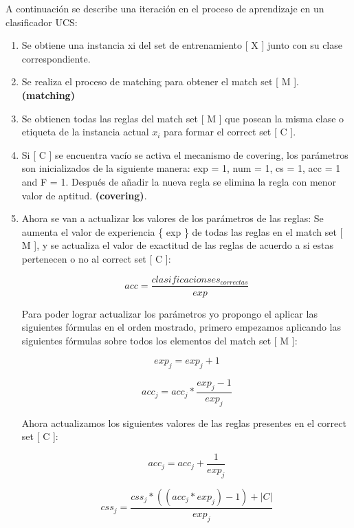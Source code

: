 \documentclass[11pt,fleqn]{book} %
\begin{document}
A continuación se describe una iteración en el proceso de aprendizaje en un clasificador UCS:
\begin{enumerate}
\item Se obtiene una instancia xi del set de entrenamiento [ X ] junto con su clase correspondiente.
\item Se realiza el proceso de matching para obtener el match set [ M ]. \textbf{(matching)} 
\item Se obtienen todas las reglas del match set [ M ] que posean la misma clase o etiqueta de la instancia actual $x_i$ para formar el correct set [ C ].
\item Si [ C ] se encuentra vacío se activa el mecanismo de covering, los parámetros son inicializados de la siguiente manera: exp = 1, num = 1, cs = 1, acc = 1 and F = 1. Después de añadir la nueva regla se elimina la regla con menor valor de aptitud. \textbf{(covering)}.
\item Ahora se van a actualizar los valores de los parámetros de las reglas:
Se aumenta el valor de experiencia \{ exp \} de todas las reglas en el match set [ M ], y se actualiza el valor de exactitud de las reglas de acuerdo a si estas pertenecen o no al correct set [ C ]:

\begin{equation}
acc=\frac{clasificacionses_{correctas}}{exp}
\end{equation}

Para poder lograr actualizar los parámetros yo propongo el aplicar las siguientes fórmulas en el orden mostrado, primero empezamos aplicando las siguientes fórmulas sobre todos los elementos del match set [ M ]:

\begin{equation}
exp_j=exp_j+1
\end{equation}

\begin{equation}
acc_j=acc_j*\frac{exp_j-1}{exp_j}
\end{equation}

Ahora actualizamos los siguientes valores de las reglas presentes en el correct set [ C ]:

\begin{equation}
acc_j=acc_j+\frac{1}{exp_j}
\end{equation}

\begin{equation}
css_j=\frac{css_j*((acc_j*exp_j)-1)+|C|}{exp_j}
\end{equation}


\end{enumerate}
\end{document}
